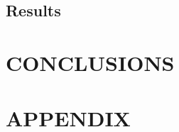 \documentclass[a4paper, 10pt, conference]{article}
\begin{document}
   
   
\subsection{Results}




\section{CONCLUSIONS}





\section*{APPENDIX}





\nocite{*}


\end{document}
